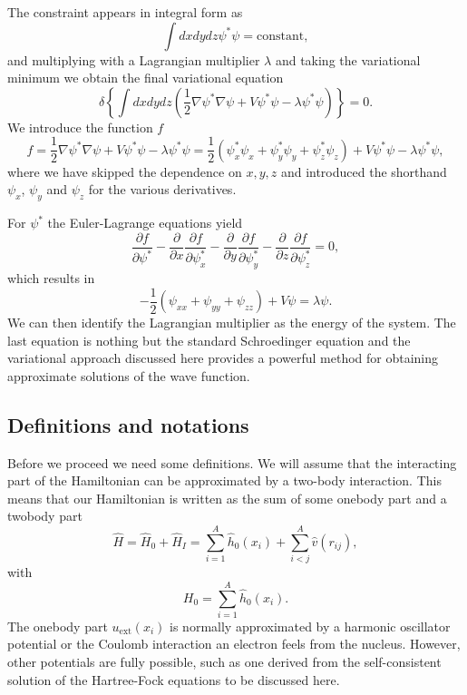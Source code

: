 \documentclass[%
twoside,                 %
final,                   %
10pt]{article}
\begin{document}
The constraint appears in integral form as 
\[
 \int dxdydz \psi^* \psi=\mathrm{constant},
\]
and multiplying with a Lagrangian multiplier $\lambda$ and taking the variational minimum we obtain the final variational equation
\[
\delta \left\{\int dxdydz\left( \frac{1}{2}\nabla\psi^*\nabla\psi+V\psi^*\psi-\lambda\psi^*\psi\right)\right\} = 0.
\]
We introduce the function  $f$
\[
  f =  \frac{1}{2}\nabla\psi^*\nabla\psi+V\psi^*\psi-\lambda\psi^*\psi=
\frac{1}{2}(\psi^*_x\psi_x+\psi^*_y\psi_y+\psi^*_z\psi_z)+V\psi^*\psi-\lambda\psi^*\psi,
\]
where we have skipped the dependence on $x,y,z$ and introduced the shorthand $\psi_x$, $\psi_y$ and $\psi_z$  for the various derivatives.

For $\psi^*$ the Euler-Lagrange  equations yield
\[
\frac{\partial f}{\partial \psi^*}- \frac{\partial }{\partial x}\frac{\partial f}{\partial \psi^*_x}-\frac{\partial }{\partial y}\frac{\partial f}{\partial \psi^*_y}-\frac{\partial }{\partial z}\frac{\partial f}{\partial \psi^*_z}=0,
\] 
which results in 
\[
    -\frac{1}{2}(\psi_{xx}+\psi_{yy}+\psi_{zz})+V\psi=\lambda \psi.
\]
We can then identify the  Lagrangian multiplier as the energy of the system. The last equation is 
nothing but the standard 
Schroedinger equation and the variational  approach discussed here provides 
a powerful method for obtaining approximate solutions of the wave function.

\subsection*{Definitions and notations}

Before we proceed we need some definitions.
We will assume that the interacting part of the Hamiltonian
can be approximated by a two-body interaction.
This means that our Hamiltonian is written as the sum of some onebody part and a twobody part
\begin{equation}
    \hat{H} = \hat{H}_0 + \hat{H}_I 
    = \sum_{i=1}^A \hat{h}_0(x_i) + \sum_{i < j}^A \hat{v}(r_{ij}),
\label{Hnuclei}
\end{equation}
with 
\begin{equation}
  H_0=\sum_{i=1}^A \hat{h}_0(x_i).
\label{hinuclei}
\end{equation}
The onebody part $u_{\mathrm{ext}}(x_i)$ is normally approximated by a harmonic oscillator potential or the Coulomb interaction an electron feels from the nucleus. However, other potentials are fully possible, such as 
one derived from the self-consistent solution of the Hartree-Fock equations to be discussed here.
\end{document}

